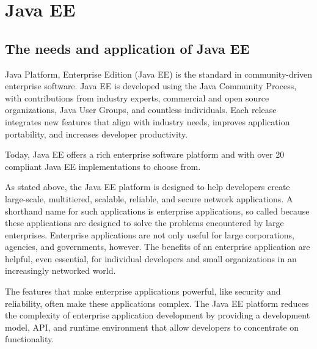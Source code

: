 \documentclass[a4paper]{report}
\begin{document}
\section{Java EE}
\subsection{The needs and application of Java EE}
Java Platform, Enterprise Edition (Java EE) is the standard in community-driven enterprise software. Java EE is developed using the Java Community Process, with contributions from industry experts, commercial and open source organizations, Java User Groups, and countless individuals. Each release integrates new features that align with industry needs, improves application portability, and increases developer productivity.
\par
Today, Java EE offers a rich enterprise software platform and with over 20 compliant Java EE implementations to choose from.
\par
As stated above, the Java EE platform is designed to help developers create large-scale, multitiered, scalable, reliable, and secure network applications. A shorthand name for such applications is enterprise applications, so called because these applications are designed to solve the problems encountered by large enterprises. Enterprise applications are not only useful for large corporations, agencies, and governments, however. The benefits of an enterprise application are helpful, even essential, for individual developers and small organizations in an increasingly networked world.
\par
The features that make enterprise applications powerful, like security and reliability, often make these applications complex. The Java EE platform reduces the complexity of enterprise application development by providing a development model, API, and runtime environment that allow developers to concentrate on functionality.
\end{document}
